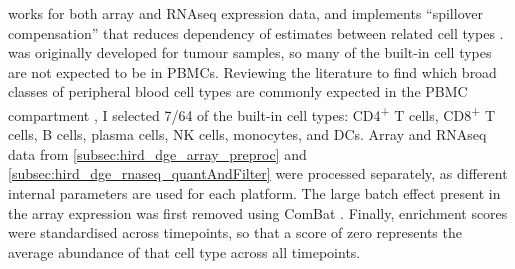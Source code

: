 works for both array and \gls{RNAseq} expression data,
and implements \enquote{spillover compensation} that reduces dependency of estimates between related cell types \autocite{aran2017XCellDigitallyPortraying}.
%
%
 was originally developed for tumour samples, so many of the built-in cell types are not expected to be in \glspl{PBMC}.
Reviewing the literature to find which broad classes of peripheral blood cell types are commonly expected in the \gls{PBMC} compartment \autocite{kleiveland2015PeripheralBloodMononuclear,vanderwijst2018SinglecellRNASequencing,davenport2018DiscoveringVivoCytokineeQTL},
I selected 7/64 of the built-in cell types: CD4\textsuperscript{+} T cells, CD8\textsuperscript{+} T cells, B cells, plasma cells, \gls{NK} cells, monocytes, and \glspl{DC}.
Array and \gls{RNAseq} data from \cref{subsec:hird_dge_array_preproc} and \cref{subsec:hird_dge_rnaseq_quantAndFilter} were processed separately, as different internal  parameters are used for each platform.
The large batch effect present in the array expression was first removed using ComBat \autocite{johnson2007AdjustingBatchEffects}.
Finally, enrichment scores were standardised across timepoints, so that a score of zero represents the average abundance of that cell type across all timepoints.

%

